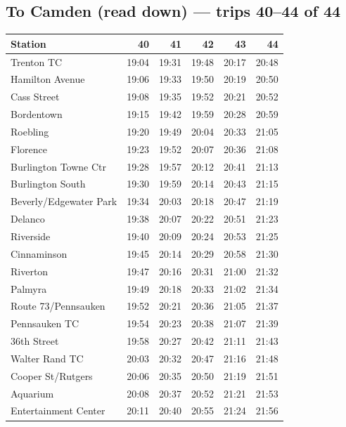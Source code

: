 \subsection*{To Camden (read down) --- trips 40--44 of 44}
\begin{center}\footnotesize\setlength{\tabcolsep}{3pt}\begin{tabular}{@{}lrrrrr@{}}\toprule
Station & 40 & 41 & 42 & 43 & 44 \\\midrule
Trenton TC & 19:04 & 19:31 & 19:48 & 20:17 & 20:48 \\
Hamilton Avenue & 19:06 & 19:33 & 19:50 & 20:19 & 20:50 \\
Cass Street & 19:08 & 19:35 & 19:52 & 20:21 & 20:52 \\
Bordentown & 19:15 & 19:42 & 19:59 & 20:28 & 20:59 \\
Roebling & 19:20 & 19:49 & 20:04 & 20:33 & 21:05 \\
Florence & 19:23 & 19:52 & 20:07 & 20:36 & 21:08 \\
Burlington Towne Ctr & 19:28 & 19:57 & 20:12 & 20:41 & 21:13 \\
Burlington South & 19:30 & 19:59 & 20:14 & 20:43 & 21:15 \\
Beverly/Edgewater Park & 19:34 & 20:03 & 20:18 & 20:47 & 21:19 \\
Delanco & 19:38 & 20:07 & 20:22 & 20:51 & 21:23 \\
Riverside & 19:40 & 20:09 & 20:24 & 20:53 & 21:25 \\
Cinnaminson & 19:45 & 20:14 & 20:29 & 20:58 & 21:30 \\
Riverton & 19:47 & 20:16 & 20:31 & 21:00 & 21:32 \\
Palmyra & 19:49 & 20:18 & 20:33 & 21:02 & 21:34 \\
Route 73/Pennsauken & 19:52 & 20:21 & 20:36 & 21:05 & 21:37 \\
Pennsauken TC & 19:54 & 20:23 & 20:38 & 21:07 & 21:39 \\
36th Street & 19:58 & 20:27 & 20:42 & 21:11 & 21:43 \\
Walter Rand TC & 20:03 & 20:32 & 20:47 & 21:16 & 21:48 \\
Cooper St/Rutgers & 20:06 & 20:35 & 20:50 & 21:19 & 21:51 \\
Aquarium & 20:08 & 20:37 & 20:52 & 21:21 & 21:53 \\
Entertainment Center & 20:11 & 20:40 & 20:55 & 21:24 & 21:56 \\
\bottomrule\end{tabular}\end{center}
\clearpage
